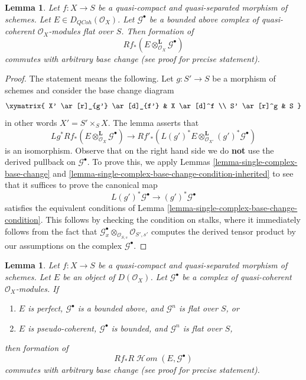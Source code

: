 \documentclass{stacks-project}
\theoremstyle{plain}
\newtheorem{lemma}[subsection]{Lemma}
\theoremstyle{definition}
\theoremstyle{remark}
\numberwithin{equation}{subsection}
\def\SheafHom{\mathop{\mathcal{H}\!\mathit{om}}\nolimits}
\def\QCoh{\mathit{QCoh}}
\begin{document}
\begin{lemma}
\label{lemma-base-change-tensor}
Let $f : X \to S$ be a quasi-compact and quasi-separated morphism of
schemes. Let $E \in D_\QCoh(\mathcal{O}_X)$. Let $\mathcal{G}^\bullet$
be a bounded above complex of quasi-coherent
$\mathcal{O}_X$-modules flat over $S$. Then formation of
$$
Rf_*(E \otimes^\mathbf{L}_{\mathcal{O}_X} \mathcal{G}^\bullet)
$$
commutes with arbitrary base change (see proof for precise statement).
\end{lemma}

\begin{proof}
The statement means the following. Let $g : S' \to S$ be a morphism of
schemes and consider the base change diagram
$$
\xymatrix{
X' \ar[r]_{g'} \ar[d]_{f'} &
X \ar[d]^f \\
S' \ar[r]^g &
S
}
$$
in other words $X' = S' \times_S X$. The lemma asserts that
$$
Lg^*Rf_*(E \otimes^\mathbf{L}_{\mathcal{O}_X} \mathcal{G}^\bullet)
\longrightarrow
Rf'_*\left(
L(g')^*E \otimes^\mathbf{L}_{\mathcal{O}_{X'}} (g')^*\mathcal{G}^\bullet
\right)
$$
is an isomorphism. Observe that on the right hand side we do {\bf not}
use the derived pullback on $\mathcal{G}^\bullet$.
To prove this, we apply Lemmas \ref{lemma-single-complex-base-change} and
\ref{lemma-single-complex-base-change-condition-inherited} to see that it
suffices to prove the canonical map
$$
L(g')^*\mathcal{G}^\bullet \to (g')^*\mathcal{G}^\bullet
$$
satisfies the equivalent conditions of
Lemma \ref{lemma-single-complex-base-change-condition}.
This follows by checking the condition on stalks, where it
immediately follows from the fact that
$\mathcal{G}^\bullet_x \otimes_{\mathcal{O}_{S, s}} \mathcal{O}_{S', s'}$
computes the derived tensor product by our assumptions on the complex
$\mathcal{G}^\bullet$.
\end{proof}

\begin{lemma}
\label{lemma-base-change-RHom}
Let $f : X \to S$ be a quasi-compact and quasi-separated morphism of schemes.
Let $E$ be an object of $D(\mathcal{O}_X)$.
Let $\mathcal{G}^\bullet$ be a complex of
quasi-coherent $\mathcal{O}_X$-modules. If
\begin{enumerate}
\item $E$ is perfect, $\mathcal{G}^\bullet$ is a bounded above,
and $\mathcal{G}^n$ is flat over $S$, or
\item $E$ is pseudo-coherent, $\mathcal{G}^\bullet$ is bounded,
and $\mathcal{G}^n$ is flat over $S$,
\end{enumerate}
then formation of
$$
Rf_*R\SheafHom(E, \mathcal{G}^\bullet)
$$
commutes with arbitrary base change (see proof for precise statement).
\end{lemma}
\end{document}
